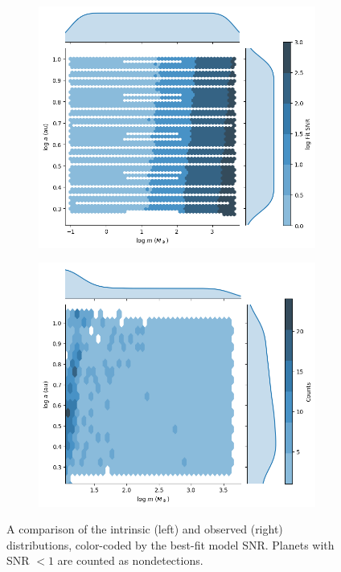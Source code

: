 \documentclass[12pt,manuscript]{aastex}
\begin{document}
\begin{figure}
  \centering
  
  \begin{subfigure}[b]{.45\linewidth}
  \includegraphics[width=\linewidth]{../figures/planets3_intrinsic}
  \subcaption{}
  \label{fig: intrinsic}
  \end{subfigure}
  \begin{subfigure}[b]{.45\linewidth}
  \includegraphics[width=\linewidth]{../figures/planets3_observed}
  \subcaption{}
  \label{fig: observed}
  \end{subfigure}
  \caption{A comparison of the intrinsic (left) and observed (right) distributions, color-coded by the best-fit model SNR. Planets with SNR $< 1$ are counted as nondetections.}
  \label{fig: distributions}
\end{figure}
\end{document}
